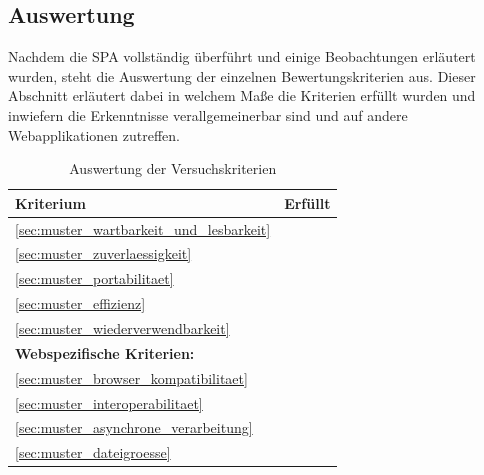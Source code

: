 \subsection{Auswertung}
\label{sec:Auswertung}
Nachdem die \ac{SPA} vollständig überführt und einige Beobachtungen erläutert wurden, steht die Auswertung der einzelnen Bewertungskriterien aus. Dieser Abschnitt erläutert dabei in welchem Maße die Kriterien erfüllt wurden und inwiefern die Erkenntnisse verallgemeinerbar sind und auf andere Webapplikationen zutreffen.
\begin{table}[htb]
\centering
\begin{tabular}{ | p{8cm} | c | }
	\hline
	\textbf{Kriterium} & \textbf{Erfüllt}\\
	\hline
	\ref{sec:muster_wartbarkeit_und_lesbarkeit} \nameref{sec:muster_wartbarkeit_und_lesbarkeit} & \checkmark\\
	\hline
	\ref{sec:muster_zuverlaessigkeit} \nameref{sec:muster_zuverlaessigkeit} & \checkmark\\
	\hline
	\ref{sec:muster_portabilitaet} \nameref{sec:muster_portabilitaet} & \checkmark\\
	\hline
	\ref{sec:muster_effizienz} \nameref{sec:muster_effizienz} & \checkmark\\
	\hline
	\ref{sec:muster_wiederverwendbarkeit} \nameref{sec:muster_wiederverwendbarkeit} & \checkmark\\
	\hline
	\multicolumn{2}{|l|}{\textbf{Webspezifische Kriterien:}} \\
	\hline
	\ref{sec:muster_browser_kompatibilitaet} \nameref{sec:muster_browser_kompatibilitaet} & \checkmark\\
	\hline
	\ref{sec:muster_interoperabilitaet} \nameref{sec:muster_interoperabilitaet} & \checkmark\\
	\hline
	\ref{sec:muster_asynchrone_verarbeitung} \nameref{sec:muster_asynchrone_verarbeitung} & \checkmark\\
	\hline
	\ref{sec:muster_dateigroesse} \nameref{sec:muster_dateigroesse} & \checkmark\\
	\hline
\end{tabular}
\caption{Auswertung der Versuchskriterien}
\label{tab:Auswertungstabelle}
\end{table}

